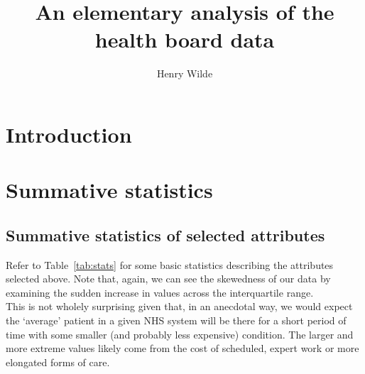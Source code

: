 \documentclass{article}
\title{An elementary analysis of the health board data}
\author{Henry Wilde}
\begin{document}
\maketitle




\section{Introduction}\label{sec:intro}


\section{Summative statistics}\label{sec:summative}


\subsection{Summative statistics of selected attributes}\label{subsec:summative}

Refer to Table~\ref{tab:stats} for some basic statistics describing the 
attributes selected above. Note that, again, we can see the skewedness of our 
data by examining the sudden increase in values across the interquartile 
range.\\

This is not wholely surprising given that, in an anecdotal way, we would expect 
the `average' patient in a given NHS system will be there for a short period of 
time with some smaller (and probably less expensive) condition. The larger and 
more extreme values likely come from the cost of scheduled, expert work or more 
elongated forms of care.
\end{document}
